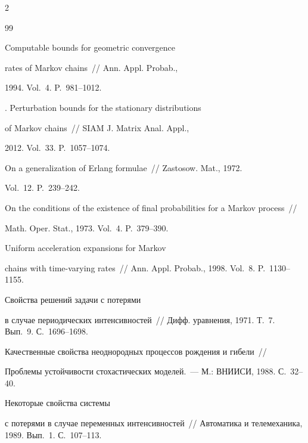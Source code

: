 \begin{multicols}{2}
{{\begin{thebibliography}{99}

 Computable bounds for geometric convergence

rates of Markov chains~// Ann. Appl. Probab.,

1994. Vol.~4. P.~981--1012.




.  Perturbation bounds for the stationary distributions

of Markov chains~// SIAM J. Matrix Anal.  Appl.,

2012. Vol.~33. P.~1057--1074.




 On a generalization of Erlang formulae~// Zastosow. Mat., 1972.

Vol.~12. P.~239--242.




 On the conditions of the existence of final probabilities for a Markov process~//

Math. Oper. Stat., 1973. Vol.~4. P.~379--390.








  Uniform acceleration expansions for Markov

chains with time-varying rates~// Ann. Appl. Probab., 1998. Vol.~8. P.~1130--1155.




 Свойства решений задачи с потерями

в случае периодических интенсивностей~// Дифф. уравнения, 1971. Т.~7. Вып.~9. С.~1696--1698.




  Качественные свойства неоднородных процессов рождения и гибели~//

Проб\-ле\-мы устойчивости стохастических моделей.~--- М.: ВНИИСИ, 1988. С.~32--40.



  Некоторые свойства сис\-те\-мы

с потерями в случае переменных интенсивностей~// Автоматика и телемеханика, 1989. Вып.~1. С.~107--113.




\end{thebibliography}}}
\end{multicols}
